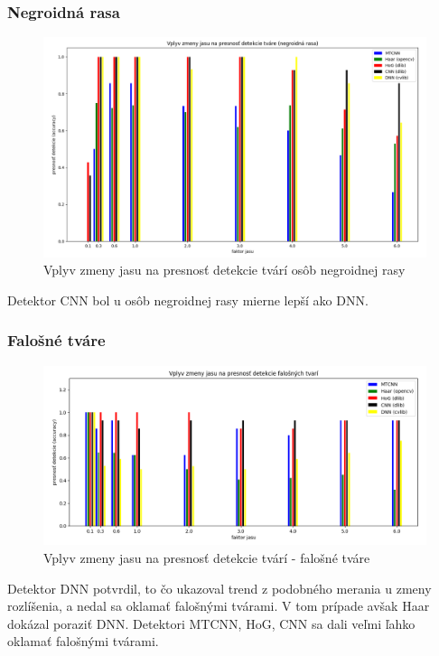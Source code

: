 \documentclass[]{article}
\begin{document}
	\subsubsection*{Negroidná rasa}
	\begin{figure}[h!]
		\includegraphics[width=\textwidth]{Vysledky_jas/negro/Figure_1.png}
		\caption{Vplyv zmeny jasu na presnosť detekcie tvárí osôb negroidnej rasy}
	\end{figure}

	Detektor CNN bol u osôb negroidnej rasy mierne lepší ako DNN.

	\subsubsection*{Falošné tváre}
	\begin{figure}[h!]
		\includegraphics[width=\textwidth]{Vysledky_jas/fake/Figure_1.png}
		\caption{Vplyv zmeny jasu na presnosť detekcie tvárí \-- falošné tváre}
	\end{figure}

	Detektor DNN potvrdil, to čo ukazoval trend z podobného merania u zmeny rozlíšenia, a nedal sa oklamať falošnými tvárami. V tom prípade avšak Haar dokázal poraziť DNN. Detektori MTCNN, HoG, CNN sa dali veľmi ľahko oklamať falošnými tvárami.
	
\end{document}
